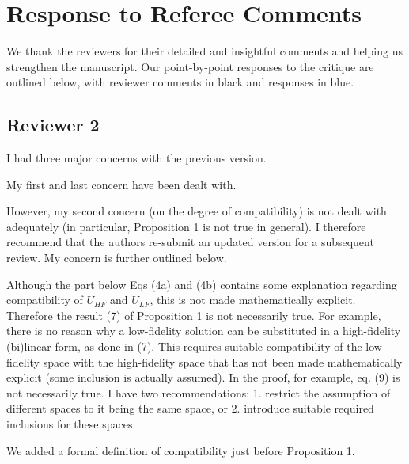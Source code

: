 \documentclass[12pt, letterpaper]{article}
\newcommand{\answer}[1]{\begin{adjustwidth}{1cm}{}{\color{blue}#1}\end{adjustwidth}}
\newcommand{\blue}[1]{{\color{blue}#1}}
\begin{document}
\section*{Response to Referee Comments}

We thank the reviewers for their detailed and insightful comments and helping us strengthen the manuscript. Our point-by-point responses to the critique are outlined below, with reviewer comments in black and \blue{responses in blue}. 


\subsection*{Reviewer 2}

I had three major concerns with the previous version.

My first and last concern have been dealt with.

However, my second concern (on the degree of compatibility) is not dealt with adequately (in particular, Proposition 1 is not true in general). I therefore recommend that the authors re-submit an updated version for a subsequent review. My concern is further outlined below.

Although the part below Eqs (4a) and (4b) contains some explanation regarding compatibility of $U_{HF}$ and $U_{LF}$, this is not made mathematically explicit.
Therefore the result (7) of Proposition 1 is not necessarily true. For example, there is no reason why a low-fidelity solution can be substituted in a high-fidelity (bi)linear form, as done in (7). This requires suitable compatibility of the low-fidelity space with the high-fidelity space that has not been made mathematically explicit (some inclusion is actually assumed). In the proof, for example, eq. (9) is not necessarily true.
I have two recommendations: 1. restrict the assumption of different spaces to it being the same space, or 2. introduce suitable required inclusions for these spaces. 

\answer{We added a formal definition of compatibility just before Proposition 1.}
\end{document}
